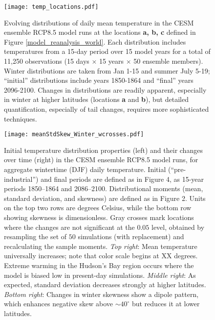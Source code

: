 \documentclass{ametsoc}
\newcommand\smallfigwidth{\columnwidth}
\begin{document}

\begin{figure}[ht]
\centerline{\texttt{[image: temp\_locations.pdf]}}
\caption{\small{Evolving distributions of daily mean temperature in the CESM ensemble RCP8.5 model runs at the locations \textbf{a, b, c} defined in Figure \ref{model_reanalysis_world}.  Each distribution includes temperatures from a 15-day period over 15 model years for a total of 11,250 observations (15 days $\times$ 15 years $\times$ 50 ensemble members). Winter distributions %
are taken from Jan 1-15 and summer July 5-19;  ``initial'' distributions include years 1850-1864 and ``final'' years 2096-2100. Changes in distributions are readily apparent, especially in winter at higher latitudes (locations \textbf{a} and \textbf{b}), but detailed quantification, especially of tail changes, requires more sophisticated techniques.}}
\label{location_distributions}
\end{figure}

\begin{figure}[ht]
\centerline{\texttt{[image: meanStdSkew\_Winter\_wcrosses.pdf]}}
\caption{\small{Initial temperature distribution properties (left) and their changes over time (right) in the CESM ensemble RCP8.5 model runs, for aggregate wintertime (DJF) daily temperature. Initial (``pre-industrial'') and final periods are defined as in Figure 4, as 15-year periods 1850--1864 and 2086--2100.  Distributional moments (mean, standard deviation, and skewness) are defined as in Figure 2. Units on the top two rows are degrees Celsius, while the bottom row showing skewness is dimensionless. Gray crosses mark locations where the changes are not significant at the $0.05$ level, obtained by resampling the set of $50$ simulations (with replacement) and recalculating the sample moments. \emph{Top right}: Mean temperature universally increases; note that color scale begins at XX degrees. Extreme warming in the Hudson's Bay region occurs where the model is biased low in present-day simulations. \emph{Middle right}: As expected, standard deviation decreases strongly at higher latitudes. \emph{Bottom right}: Changes in winter skewness show a dipole pattern, which enhances negative skew above $\sim 40 ^\circ$ but reduces it at lower latitudes. }}
\label{meanStdSkew_Winter}
\end{figure}
\end{document}

